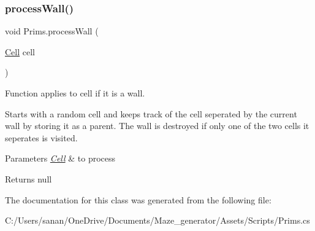 \subsubsection{\texorpdfstring{processWall()}{processWall()}}
{\footnotesize\ttfamily void Prims.\+process\+Wall (\begin{DoxyParamCaption}\item[{\mbox{\hyperlink{class_cell}{Cell}}}]{cell }\end{DoxyParamCaption})\hspace{0.3cm}{\ttfamily [private]}}



Function applies to cell if it is a wall. 

Starts with a random cell and keeps track of the cell seperated by the current wall by storing it as a parent. The wall is destroyed if only one of the two cells it seperates is visited.


\begin{DoxyParams}{Parameters}
{\em \mbox{\hyperlink{class_cell}{Cell}}} & to process\\
\hline
\end{DoxyParams}
\begin{DoxyReturn}{Returns}
null 
\end{DoxyReturn}


The documentation for this class was generated from the following file\+:\begin{DoxyCompactItemize}
\item 
C\+:/\+Users/sanan/\+One\+Drive/\+Documents/\+Maze\+\_\+generator/\+Assets/\+Scripts/Prims.\+cs\end{DoxyCompactItemize}
